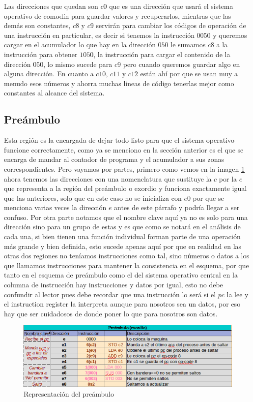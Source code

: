 \documentclass[12pt]{article}
\begin{document}
	
	Las direcciones que quedan son $c0$ que es una dirección que usará el sistema operativo de comodín para guardar
	valores y recuperarlos, mientras que las demás son constantes, $c8$ y $c9$ servirán para cambiar los códigos de operación
	de una instrucción en particular, es decir si tenemos la instrucción $0050$ y queremos cargar en el acumulador lo que
	hay en la dirección $050$ le sumamos $c8$ a la instrucción para obtener $1050$, la instrucción para cargar el contenido
	de la dirección $050$, lo mismo sucede para $c9$ pero cuando queremos guardar algo en alguna dirección. En cuanto
	a $c10$, $c11$ y $c12$ están ahí por que se usan muy a menudo esos números y ahorra muchas lineas de código tenerlas mejor
	como constantes al alcance del sistema.
	
	
	\subsection{Preámbulo}
	
	Esta región es la encargada de dejar todo listo para que el sistema operativo funcione correctamente, como
	ya se menciono en la sección anterior es el que se encarga de mandar al contador de programa y el acumulador a
	sus zonas correspondientes. Pero vayamos por partes, primero como vemos en la imagen \ref{fig:preambulo} ahora
	tenemos las direcciones con una nomenclatura que sustituye la $c$ por la $e$ que representa a la región del preámbulo o
	exordio y funciona exactamente igual que las anteriores, solo que en este caso no se inicializa con $e0$ por que se menciona
	varias veces la dirección $e$ antes de este párrafo y podría llegar a ser confuso. Por otra parte notamos que
	el nombre clave aquí ya no es solo para una dirección sino para un grupo de estas y es que como se notará
	en el análisis de cada una, si bien tienen una función individual forman parte de una operación más grande y
	bien definida, esto sucede apenas aquí por que en realidad en las otras dos regiones no teníamos
	instrucciones como tal, sino números o datos a los que llamamos instrucciones para mantener la consistencia
	en el esquema, por que tanto en el esquema de preámbulo como el del sistema operativo central en la columna
	de instrucción hay instrucciones y datos por igual, esto no debe confundir al lector pues debe recordar que
	una instrucción lo será si el $pc$ la lee y el instruction register la interpreta aunque para nosotros
	sea un datos, por eso hay que ser cuidadosos de donde poner lo que para nosotros son datos.
	
	\begin{figure}[ht]
		\centering
		\includegraphics[scale=0.5]{media/Preambulo} 
		\caption{Representación del preámbulo}
		\label{fig:preambulo}
	\end{figure}
		
\end{document}
